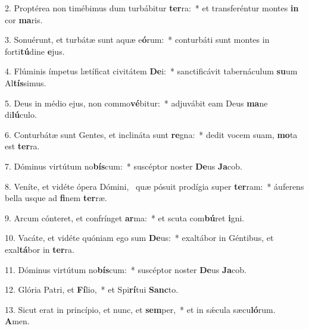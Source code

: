 2. Proptérea non timébimus dum turbábitur \textbf{ter}ra:~*  et transferéntur montes \textbf{in} cor \textbf{ma}ris.\

3. Sonuérunt, et turbátæ sunt aquæ e\textbf{ó}rum:~*  conturbáti sunt montes in forti\textbf{tú}dine \textbf{e}jus.\

4. Flúminis ímpetus lætíficat civitátem \textbf{De}i:~*  sanctificávit tabernáculum \textbf{su}um Al\textbf{tís}simus.\

5. Deus in médio ejus, non commo\textbf{vé}bitur:~*  adjuvábit eam Deus \textbf{ma}ne di\textbf{lú}culo.\

6. Conturbátæ sunt Gentes, et inclináta sunt \textbf{re}gna:~*  dedit vocem suam, \textbf{mo}ta est \textbf{ter}ra.\

7. Dóminus virtútum no\textbf{bís}cum:~*  suscéptor noster \textbf{De}us \textbf{Ja}cob.\

8. Veníte, et vidéte ópera Dómini, \dag\  quæ pósuit prodígia super \textbf{ter}ram:~*  áuferens bella usque ad \textbf{fi}nem \textbf{ter}ræ.\

9. Arcum cónteret, et confrínget \textbf{ar}ma:~*  et scuta com\textbf{bú}ret \textbf{i}gni.\

10. Vacáte, et vidéte quóniam ego sum \textbf{De}us:~*  exaltábor in Géntibus, et exal\textbf{tá}bor in \textbf{ter}ra.\

11. Dóminus virtútum no\textbf{bís}cum:~*  suscéptor noster \textbf{De}us \textbf{Ja}cob.\

12. Glória Patri, et \textbf{Fí}lio,~*  et Spi\textbf{rí}tui \textbf{Sanc}to.\

13. Sicut erat in princípio, et nunc, et \textbf{sem}per,~*  et in sǽcula sæcu\textbf{ló}rum. \textbf{A}men.\

